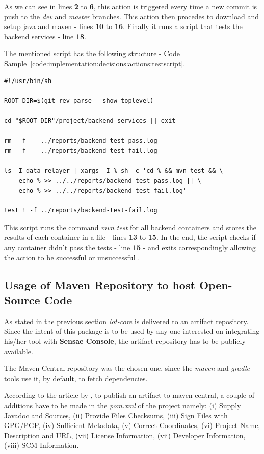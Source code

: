 As we can see in lines \textbf{2} to \textbf{6}, this action is triggered every time a new commit is push to the \textit{dev} and \textit{master} branches.
This action then procedes to download and setup java and maven - lines \textbf{10} to \textbf{16}. Finally it runs a script that tests the backend services - line \textbf{18}.

The mentioned script has the following structure - Code Sample~\ref{code:implementation:decisions:actions:testscript}.

\begin{lstlisting}[caption=Backend services test script, label={code:implementation:decisions:actions:testscript}]
#!/usr/bin/sh

ROOT_DIR=$(git rev-parse --show-toplevel)

cd "$ROOT_DIR"/project/backend-services || exit

rm --f -- ../reports/backend-test-pass.log
rm --f -- ../reports/backend-test-fail.log

ls -I data-relayer | xargs -I % sh -c 'cd % && mvn test && \
    echo % >> ../../reports/backend-test-pass.log || \
    echo % >> ../../reports/backend-test-fail.log'

test ! -f ../reports/backend-test-fail.log      
\end{lstlisting}

This script runs the command \textit{mvn test} for all backend containers and stores the results of each container in a file - lines \textbf{13} to \textbf{15}. In the end, the script checks if any container didn't pass the tests - line \textbf{15} - and exits correspondingly allowing the action to be successful or unsuccessful .

\subsection{Usage of Maven Repository to host Open-Source Code}
\label{subsec:implementation:decisions:maven}

As stated in the previous section \textit{iot-core} is delivered to an artifact repository. Since the intent of this package is to be used by any one interested on integrating his/her tool with \textbf{Sensae Console}, the artifact repository has to be publicly available. 

The Maven Central repository was the chosen one, since the \textit{maven} and \textit{gradle} tools use it, by default, to fetch dependencies.

According to the article  by \cite{centralreq}, to publish an artifact to maven central, a couple of additions have to be made in the \textit{pom.xml} of the project namely: (i) Supply Javadoc and Sources, (ii) Provide Files Checksums, (iii) Sign Files with GPG/PGP, (iv) Sufficient Metadata, (v) Correct Coordinates, (vi) Project Name, Description and URL, (vii) License Information, (vii) Developer Information, (viii) SCM Information.

